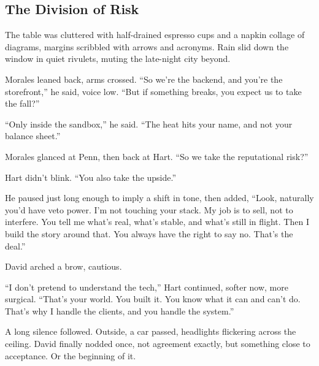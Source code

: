 \medskip

\subsection{The Division of Risk}

The table was cluttered with half-drained espresso cups and a napkin collage of diagrams, margins scribbled with 
arrows and acronyms. Rain slid down the window in quiet rivulets, muting the late-night city beyond.

Morales leaned back, arms crossed. ``So we’re the backend, and you’re the storefront,'' he said, voice low. ``But 
if something breaks, you expect us to take the fall?''

``Only inside the sandbox,'' he said. ``The heat hits your name, and not your balance sheet.''

Morales glanced at Penn, then back at Hart. ``So we take the reputational risk?''

Hart didn’t blink. ``You also take the upside.''

He paused just long enough to imply a shift in tone, then added, ``Look, naturally you'd have veto power. 
I’m not touching your stack. My job is to sell, not to interfere. You tell me what’s real, what’s stable, 
and what’s still in flight. Then I build the story around that. You always have the right to say no. 
That’s the deal.''

David arched a brow, cautious.

``I don’t pretend to understand the tech,'' Hart continued, softer now, more surgical. ``That’s your world. You built it. 
You know what it can and can’t do. That’s why I handle the clients, and you handle the system.''

A long silence followed. Outside, a car passed, headlights flickering across the ceiling. David finally nodded once, 
not agreement exactly, but something close to acceptance. Or the beginning of it.

\medskip

